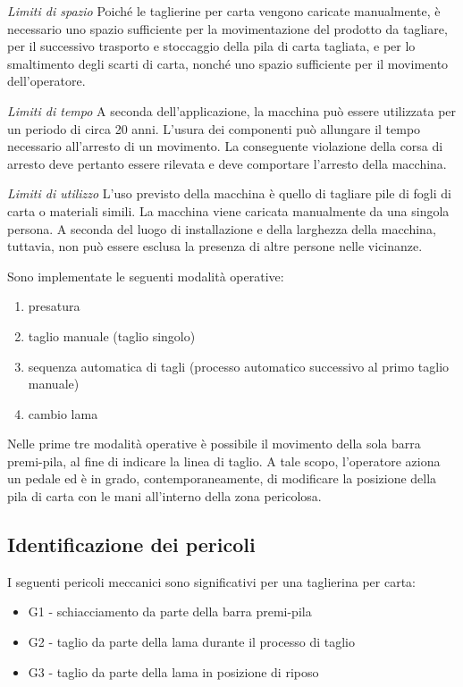 \textit{Limiti di spazio}
Poiché le taglierine per carta vengono caricate manualmente, è necessario uno spazio sufficiente per la movimentazione del prodotto da tagliare, per il successivo trasporto e stoccaggio della pila di carta tagliata, e per lo smaltimento degli scarti di carta, nonché uno spazio sufficiente per il movimento dell'operatore.

\textit{Limiti di tempo}
A seconda dell'applicazione, la macchina può essere utilizzata per un periodo di circa 20 anni. L'usura dei componenti può allungare il tempo necessario all'arresto di un movimento. La conseguente violazione della corsa di arresto deve pertanto essere rilevata e deve comportare l'arresto della macchina.

\textit{Limiti di utilizzo}
L'uso previsto della macchina è quello di tagliare pile di fogli di carta o materiali simili. La macchina viene caricata manualmente da una singola persona. A seconda del luogo di installazione e della larghezza della macchina, tuttavia, non può essere esclusa la presenza di altre persone nelle vicinanze.

Sono implementate le seguenti modalità operative:
\begin{enumerate}
    \item presatura
    \item taglio manuale (taglio singolo)
    \item sequenza automatica di tagli (processo automatico successivo al primo taglio manuale)
    \item cambio lama
\end{enumerate}

Nelle prime tre modalità operative è possibile il movimento della sola barra premi-pila, al fine di indicare la linea di taglio. A tale scopo, l'operatore aziona un pedale ed è in grado, contemporaneamente, di modificare la posizione della pila di carta con le mani all'interno della zona pericolosa.

\subsection{Identificazione dei pericoli}
\label{subsec:05-7-2}
I seguenti pericoli meccanici sono significativi per una taglierina per carta:
\begin{itemize}
    \item G1 - schiacciamento da parte della barra premi-pila
    \item G2 - taglio da parte della lama durante il processo di taglio
    \item G3 - taglio da parte della lama in posizione di riposo
\end{itemize}

